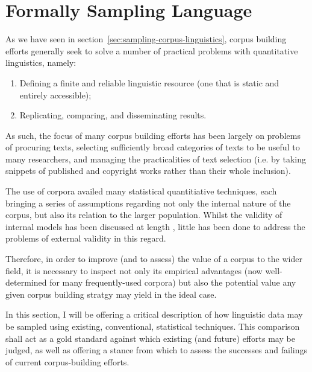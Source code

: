 \section{Formally Sampling Language}
As we have seen in section~\ref{sec:sampling-corpus-linguistics}, corpus building efforts generally seek to solve a number of practical problems with quantitative linguistics, namely:
\begin{enumerate}
    \item Defining a finite and reliable linguistic resource (one that is static and entirely accessible);
    \item Replicating, comparing, and disseminating results.
\end{enumerate}

As such, the focus of many corpus building efforts 
has been largely on problems of procuring texts, selecting sufficiently broad categories of texts to be useful to many researchers, and managing the practicalities of text selection (i.e. by taking snippets of published and copyright works rather than their whole inclusion).

The use of corpora availed many statistical quantitiative techniques, each bringing a series of assumptions regarding not only the internal nature of the corpus, but also its relation to the larger population.  Whilst the validity of internal models has been discussed at length
, little has been done to address the problems of external validity in this regard.

Therefore, in order to improve (and to assess) the value of a corpus to the wider field, it is necessary to inspect not only its empirical advantages (now well-determined for many frequently-used corpora) but also the potential value any given corpus building stratgy may yield in the ideal case.

In this section, I will be offering a critical description of how linguistic data may be sampled using existing, conventional, statistical techniques.  This comparison shall act as a gold standard against which existing (and future) efforts may be judged, as well as offering a stance from which to assess the successes and failings of current corpus-building efforts.



